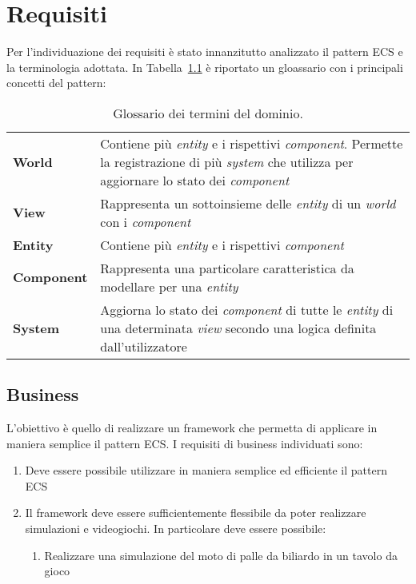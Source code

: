 \chapter{Requisiti}\label{ch:requisiti}
Per l'individuazione dei requisiti è stato innanzitutto analizzato il pattern ECS e la terminologia adottata.
In Tabella~\ref{tab:glossario} è riportato un gloassario con i principali concetti del pattern:
\begin{table}[H]
    \begin{tabular}{p{0.15\linewidth}p{0.85\linewidth}}
        \toprule
        \textbf{World}     & Contiene più \textit{entity} e i rispettivi \textit{component}.
        Permette la registrazione di più \textit{system} che utilizza per aggiornare lo stato dei \textit{component} \\
        \textbf{View}      & Rappresenta un sottoinsieme delle \textit{entity} di un \textit{world} con i \textit{component}                                                                              \\
        \textbf{Entity}    & Contiene più \textit{entity} e i rispettivi \textit{component}                                                                                                           \\
        \textbf{Component} & Rappresenta una particolare caratteristica da modellare per una \textit{entity}                                                                                              \\
        \textbf{System}    & Aggiorna lo stato dei \textit{component} di tutte le \textit{entity} di una determinata \textit{view} secondo una logica definita dall'utilizzatore                          \\
        \bottomrule
    \end{tabular}\caption{\label{tab:glossario}Glossario dei termini del dominio.}
\end{table}

\section{Business}\label{sec:business}
L'obiettivo è quello di realizzare un framework che permetta di applicare in maniera semplice il pattern ECS\@.
I requisiti di business individuati sono:
\begin{enumerate}[label=\textbf{\ref{sec:business}.\arabic*}]
    \item \label{itm:b1} Deve essere possibile utilizzare in maniera semplice ed efficiente il pattern ECS
    \item \label{itm:b2} Il framework deve essere sufficientemente flessibile da poter realizzare simulazioni e videogiochi.
    In particolare deve essere possibile:
    \begin{enumerate}[label=\textbf{\ref{itm:b2}.\arabic*}]
        \item \label{itm:bb3} Realizzare una simulazione del moto di palle da biliardo in un tavolo da gioco
    \end{enumerate}
\end{enumerate}

